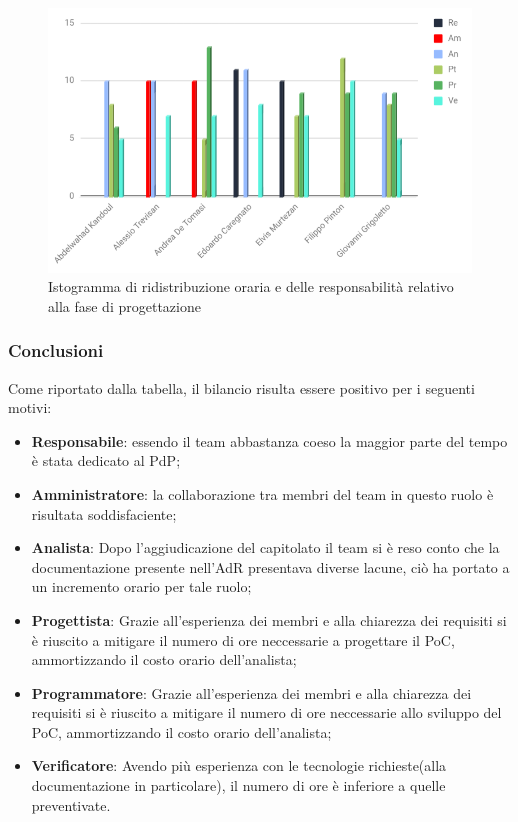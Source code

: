  \begin{figure}[h!]
	\caption{Istogramma di ridistribuzione oraria e delle responsabilità relativo alla fase di progettazione}
    \includegraphics[width=1\textwidth]{./src/Preventivo/src/img/istoConsuntivoProgettazioneRuoli.png}  
\end{figure} 


\subsubsection{Conclusioni}
Come riportato dalla tabella, il bilancio risulta essere positivo per i seguenti motivi:
\begin{itemize}
	\item \textbf{Responsabile}: {essendo il team abbastanza coeso la maggior parte del tempo è stata dedicato al PdP;}
	\item \textbf{Amministratore}: {la collaborazione tra membri del team in questo ruolo è risultata soddisfaciente;}
	\item \textbf{Analista}: {Dopo l'aggiudicazione del capitolato il team si è reso conto che la documentazione presente nell'AdR presentava diverse lacune, ciò ha portato a un incremento orario per tale ruolo;}
	\item \textbf{Progettista}: {Grazie all'esperienza dei membri e alla chiarezza dei requisiti si è riuscito a mitigare il numero di ore neccessarie a progettare il PoC, ammortizzando il costo orario dell'analista;}
	\item \textbf{Programmatore}: {Grazie all'esperienza dei membri e alla chiarezza dei requisiti si è riuscito a mitigare il numero di ore neccessarie allo sviluppo del PoC, ammortizzando il costo orario dell'analista;}
	\item \textbf{Verificatore}: {Avendo più esperienza con le tecnologie richieste(alla documentazione in particolare), il numero di ore è inferiore a quelle preventivate.}
\end{itemize}
